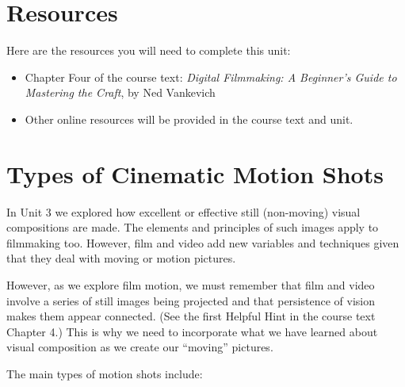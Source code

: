 \documentclass[
]{book}
\providecommand{\tightlist}{%
  \setlength{\itemsep}{0pt}\setlength{\parskip}{0pt}}
\begin{document}
\hypertarget{resources-3}{%
\section*{Resources}\label{resources-3}}

Here are the resources you will need to complete this unit:

\begin{itemize}
\tightlist
\item
  Chapter Four of the course text: \emph{Digital Filmmaking: A Beginner's Guide to Mastering the Craft}, by Ned Vankevich
\item
  Other online resources will be provided in the course text and unit.
\end{itemize}

\hypertarget{types-of-cinematic-motion-shots}{%
\section{Types of Cinematic Motion Shots}\label{types-of-cinematic-motion-shots}}

In Unit 3 we explored how excellent or effective still (non-moving) visual compositions are made. The elements and principles of such images apply to filmmaking too. However, film and video add new variables and techniques given that they deal with moving or motion pictures.

However, as we explore film motion, we must remember that film and video involve a series of still images being projected and that persistence of vision makes them appear connected. (See the first Helpful Hint in the course text Chapter 4.) This is why we need to incorporate what we have learned about visual composition as we create our ``moving'' pictures.

The main types of motion shots include:
\end{document}
